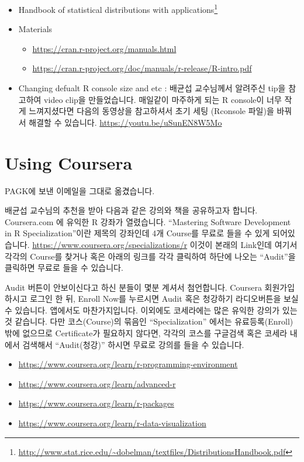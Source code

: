 \documentclass[10pt,]{krantz}
\providecommand{\tightlist}{%
  \setlength{\itemsep}{0pt}\setlength{\parskip}{0pt}}
\renewenvironment{quote}{\begin{VF}}{\end{VF}}
\renewcommand{\href}[2]{#2\footnote{\url{#1}}}
\begin{document}
\begin{itemize}
\tightlist
\item
  \href{http://www.stat.rice.edu/~dobelman/textfiles/DistributionsHandbook.pdf}{Handbook
  of statistical distributions with applications}
  \citep{krishnamoorthy2006handbook}
\item
  Materials

  \begin{itemize}
  \tightlist
  \item
    \url{https://cran.r-project.org/manuals.html}
  \item
    \url{https://cran.r-project.org/doc/manuals/r-release/R-intro.pdf}
  \end{itemize}
\item
  Changing defualt R console size and etc : 배균섭 교수님께서 알려주신
  tip을 참고하여 video clip을 만들었습니다. 매일같이 마주하게 되는 R
  console이 너무 작게 느껴지셨다면 다음의 동영상을 참고하셔서 초기 세팅
  (Rconsole 파일)을 바꿔서 해결할 수 있습니다.
  \url{https://youtu.be/uSunEN8W5Mo}
\end{itemize}

\section{Using Coursera}\label{using-coursera}

\begin{quote}
PAGK에 보낸 이메일을 그대로 옮겼습니다.
\end{quote}

배균섭 교수님의 추천을 받아 다음과 같은 강의와 책을 공유하고자 합니다.
Coursera.com 에 유익한 R 강좌가 열렸습니다. ``Mastering Software
Development in R Specialization''이란 제목의 강좌인데 4개 Course를
무료로 들을 수 있게 되어있습니다.
\url{https://www.coursera.org/specializations/r} 이것이 본래의 Link인데
여기서 각각의 Course를 찾거나 혹은 아래의 링크를 각각 클릭하여 하단에
나오는 ``Audit''을 클릭하면 무료로 들을 수 있습니다.

Audit 버튼이 안보이신다고 하신 분들이 몇분 계셔서 첨언합니다. Coursera
회원가입하시고 로그인 한 뒤, Enroll Now를 누르시면 Audit 혹은 청강하기
라디오버튼을 보실 수 있습니다. 앱에서도 마찬가지입니다. 이외에도
코세라에는 많은 유익한 강의가 있는 것 같습니다. 다만 코스(Course)의
묶음인 ``Specialization'' 에서는 유료등록(Enroll) 밖에 없으므로
Certificate가 필요하지 않다면, 각각의 코스를 구글검색 혹은 코세라 내에서
검색해서 ``Audit(청강)'' 하시면 무료로 강의를 들을 수 있습니다.

\begin{itemize}
\tightlist
\item
  \url{https://www.coursera.org/learn/r-programming-environment}
\item
  \url{https://www.coursera.org/learn/advanced-r}
\item
  \url{https://www.coursera.org/learn/r-packages}
\item
  \url{https://www.coursera.org/learn/r-data-visualization}
\end{itemize}
\end{document}

